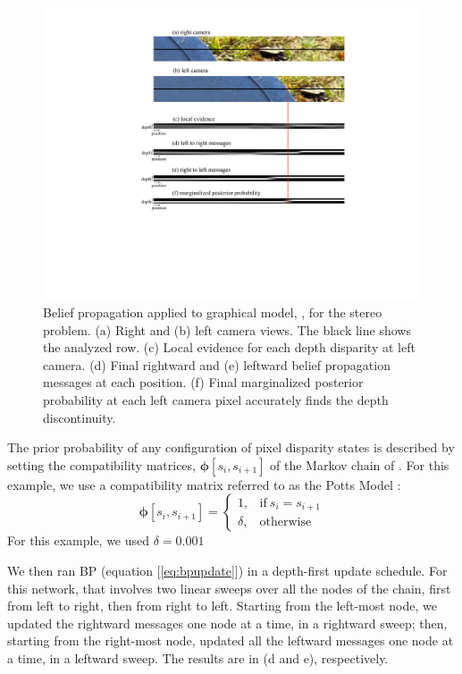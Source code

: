 \begin{figure}
\centerline{
\includegraphics[width=.8\linewidth]{figures/graphical_models/bpcanoes5.pdf}
}
\caption{
Belief propagation applied to graphical model, \fig{\ref{fig:canoe3}}, for the stereo problem. (a) Right and (b) left camera views. The black line shows the analyzed row. (c) Local evidence for each depth disparity at left camera. (d) Final rightward and (e) leftward belief propagation messages at each position. (f) Final marginalized posterior probability at each left camera pixel accurately finds the depth discontinuity.}
\label{fig:canoe4}
\end{figure}


The prior probability of any configuration of pixel disparity states is described by setting the compatibility matrices, $\mathbf{\phi}[s_i, s_{i+1}]$ of the Markov chain of \fig{\ref{fig:canoe3}}.  For this example, we use a compatibility matrix referred to as the Potts Model \cite{Wu1982}:
\begin{equation}
  \mathbf{\phi}[s_i, s_{i+1}] = 
    \begin{cases}
      1, & \text{if}\ s_i = s_{i+1} \\
      \delta, & \text{otherwise}
    \end{cases}
\end{equation}
For this example, we used $\delta = 0.001$

We then ran BP (equation [\ref{eq:bpupdate}]) in a depth-first update schedule.  For this network, that involves two linear sweeps over all the nodes of the chain, first from left to right, then from right to left.  Starting from the left-most node, we updated the rightward messages one node at a time, in a rightward sweep; then, starting from the right-most node, updated all the leftward messages one node at a time, in a leftward sweep.  The results are in \fig{\ref{fig:canoe4}}(d and e), respectively.

